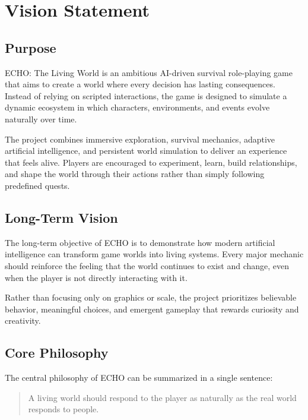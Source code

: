\chapter{Vision Statement}

\section{Purpose}

ECHO: The Living World is an ambitious AI-driven survival role-playing game that aims to create a world where every decision has lasting consequences. Instead of relying on scripted interactions, the game is designed to simulate a dynamic ecosystem in which characters, environments, and events evolve naturally over time.

The project combines immersive exploration, survival mechanics, adaptive artificial intelligence, and persistent world simulation to deliver an experience that feels alive. Players are encouraged to experiment, learn, build relationships, and shape the world through their actions rather than simply following predefined quests.

\section{Long-Term Vision}

The long-term objective of ECHO is to demonstrate how modern artificial intelligence can transform game worlds into living systems. Every major mechanic should reinforce the feeling that the world continues to exist and change, even when the player is not directly interacting with it.

Rather than focusing only on graphics or scale, the project prioritizes believable behavior, meaningful choices, and emergent gameplay that rewards curiosity and creativity.

\section{Core Philosophy}

The central philosophy of ECHO can be summarized in a single sentence:

\begin{quote}
A living world should respond to the player as naturally as the real world responds to people.
\end{quote}